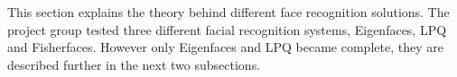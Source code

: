 This section explains the theory behind different face recognition solutions. The project group tested three different facial recognition systems, Eigenfaces, LPQ and Fisherfaces. However only Eigenfaces and LPQ became complete, they are described further in the next two subsections.

